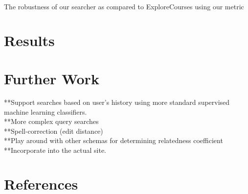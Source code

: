 \documentclass[12pt]{article}
\begin{document}
The robustness of our searcher as compared to ExploreCourses using our
metric
\section*{Results}
	
\section*{Further Work}
**Support searches based on user's history using more standard supervised machine learning classifiers.\\
	**More complex query searches\\
	**Spell-correction (edit distance)\\
	**Play around with other schemas for determining relatedness coefficient\\
	**Incorporate into the actual site.\\

\section*{References}
\end{document}
